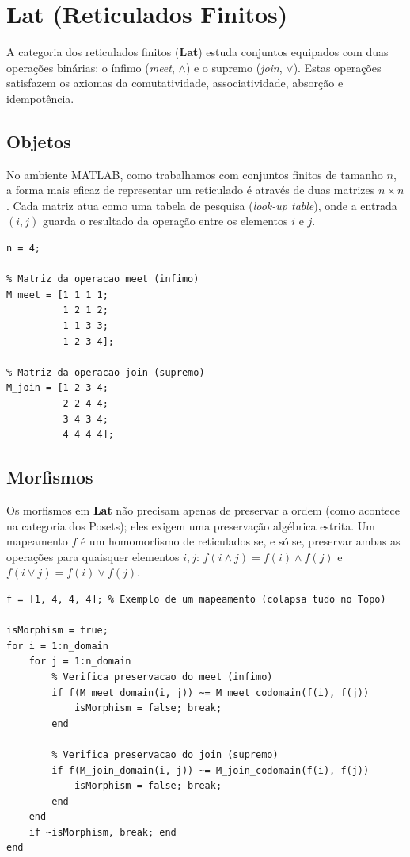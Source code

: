 \section{Lat (Reticulados Finitos)}

A categoria dos reticulados finitos (\textbf{Lat}) estuda conjuntos equipados com duas operações binárias: o ínfimo (\emph{meet}, $\wedge$) e o supremo (\emph{join}, $\vee$). Estas operações satisfazem os axiomas da comutatividade, associatividade, absorção e idempotência.

\subsection{Objetos}
No ambiente MATLAB, como trabalhamos com conjuntos finitos de tamanho $n$, a forma mais eficaz de representar um reticulado é através de duas matrizes $n \times n$. Cada matriz atua como uma tabela de pesquisa (\emph{look-up table}), onde a entrada $(i, j)$ guarda o resultado da operação entre os elementos $i$ e $j$.

\begin{lstlisting}[caption={Representação de um Reticulado (Diamante de 4 elementos)}]
% Reticulado com 4 elementos: 1 (Fundo), 2 e 3 (Incomparaveis), 4 (Topo)
n = 4;

% Matriz da operacao meet (infimo)
M_meet = [1 1 1 1; 
          1 2 1 2; 
          1 1 3 3; 
          1 2 3 4];

% Matriz da operacao join (supremo)
M_join = [1 2 3 4; 
          2 2 4 4; 
          3 4 3 4; 
          4 4 4 4];
\end{lstlisting}

\subsection{Morfismos}
Os morfismos em \textbf{Lat} não precisam apenas de preservar a ordem (como acontece na categoria dos Posets); eles exigem uma preservação algébrica estrita. Um mapeamento $f$ é um homomorfismo de reticulados se, e só se, preservar ambas as operações para quaisquer elementos $i, j$: $f(i \wedge j) = f(i) \wedge f(j)$ e $f(i \vee j) = f(i) \vee f(j)$.

\begin{lstlisting}[caption={Algoritmo de Verificacao de Homomorfismo de Reticulados}]
% f e um vetor onde o indice e o dominio e o valor e a imagem
f = [1, 4, 4, 4]; % Exemplo de um mapeamento (colapsa tudo no Topo)

isMorphism = true;
for i = 1:n_domain
    for j = 1:n_domain
        % Verifica preservacao do meet (infimo)
        if f(M_meet_domain(i, j)) ~= M_meet_codomain(f(i), f(j))
            isMorphism = false; break;
        end
        
        % Verifica preservacao do join (supremo)
        if f(M_join_domain(i, j)) ~= M_join_codomain(f(i), f(j))
            isMorphism = false; break;
        end
    end
    if ~isMorphism, break; end
end
\end{lstlisting}